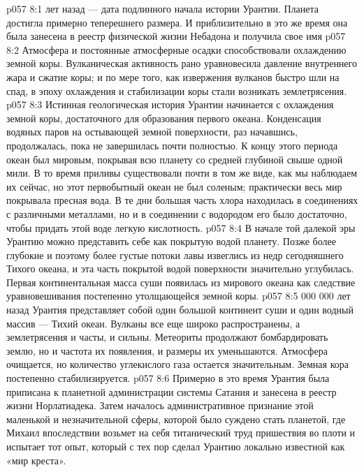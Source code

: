 \vs p057 8:1  лет назад --- дата подлинного начала истории Урантии. Планета достигла примерно теперешнего размера. И приблизительно в это же время она была занесена в реестр физической жизни Небадона и получила свое имя 
\vs p057 8:2 Атмосфера и постоянные атмосферные осадки способствовали охлаждению земной коры. Вулканическая активность рано уравновесила давление внутреннего жара и сжатие коры; и по мере того, как извержения вулканов быстро шли на спад, в эпоху охлаждения и стабилизации коры стали возникать землетрясения.
\vs p057 8:3 Истинная геологическая история Урантии начинается с охлаждения земной коры, достаточного для образования первого океана. Конденсация водяных паров на остывающей земной поверхности, раз начавшись, продолжалась, пока не завершилась почти полностью. К концу этого периода океан был мировым, покрывая всю планету со средней глубиной свыше одной мили. В то время приливы существовали почти в том же виде, как мы наблюдаем их сейчас, но этот первобытный океан не был соленым; практически весь мир покрывала пресная вода. В те дни большая часть хлора находилась в соединениях с различными металлами, но и в соединении с водородом его было достаточно, чтобы придать этой воде легкую кислотность.
\vs p057 8:4 В начале той далекой эры Урантию можно представить себе как покрытую водой планету. Позже более глубокие и поэтому более густые потоки лавы извеглись из недр сегодняшнего Тихого океана, и эта часть покрытой водой поверхности значительно углубилась. Первая континентальная масса суши появилась из мирового океана как следствие уравновешивания постепенно утолщающейся земной коры.
\vs p057 8:5  000 000 лет назад Урантия представляет собой один большой континент суши и один водный массив --- Тихий океан. Вулканы все еще широко распространены, а землетрясения и часты, и сильны. Метеориты продолжают бомбардировать землю, но и частота их появления, и размеры их уменьшаются. Атмосфера очищается, но количество углекислого газа остается значительным. Земная кора постепенно стабилизируется.
\vs p057 8:6 Примерно в это время Урантия была приписана к планетной администрации системы Сатания и занесена в реестр жизни Норлатиадека. Затем началось административное признание этой маленькой и незначительной сферы, которой было суждено стать планетой, где Михаил впоследствии возьмет на себя титанический труд пришествия во плоти и испытает тот опыт, который с тех пор сделал Урантию локально известной как «мир креста».
